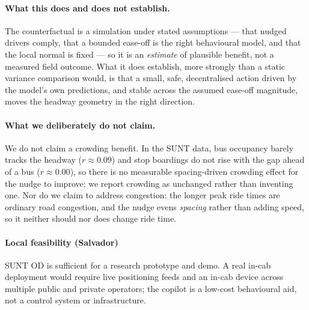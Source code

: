 \documentclass[final,5p,times,twocolumn,authoryear]{elsarticle}
\begin{document}
\paragraph{What this does and does not establish.}
The counterfactual is a simulation under stated assumptions --- that nudged drivers comply, that a
bounded ease-off is the right behavioural model, and that the local normal is fixed --- so it is an
\emph{estimate} of plausible benefit, not a measured field outcome. What it does establish, more
strongly than a static variance comparison would, is that a small, safe, decentralised action driven
by the model's own predictions, and stable across the assumed ease-off magnitude, moves the headway
geometry in the right direction.

\paragraph{What we deliberately do not claim.}
We do not claim a crowding benefit. In the SUNT data, bus occupancy barely tracks the headway
($r \approx 0.09$) and stop boardings do not rise with the gap ahead of a bus ($r \approx 0.00$), so
there is no measurable spacing-driven crowding effect for the nudge to improve; we report crowding as
unchanged rather than inventing one. Nor do we claim to address congestion: the longer peak ride
times are ordinary road congestion, and the nudge evens \emph{spacing} rather than adding speed, so
it neither should nor does change ride time.

\paragraph{Local feasibility (Salvador)}
SUNT OD is sufficient for a research prototype and demo. A real in-cab deployment would require
live positioning feeds and an in-cab device across multiple public and private operators; the
copilot is a low-cost behavioural aid, not a control system or infrastructure.
\end{document}
